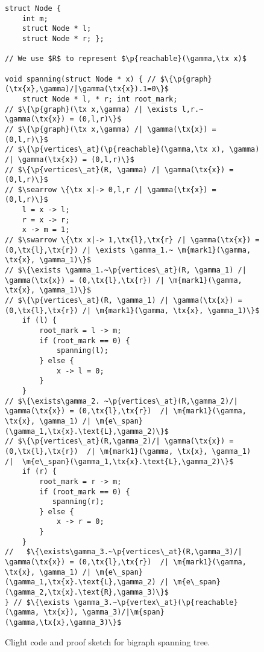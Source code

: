 \begin{figure}
  \begin{lstlisting}
struct Node {
    int m;
    struct Node * l;
    struct Node * r; };

// We use $R$ to represent $\p{reachable}(\gamma,\tx x)$

void spanning(struct Node * x) { // $\{\p{graph}(\tx{x},\gamma)/|\gamma(\tx{x}).1=0\}$
    struct Node * l, * r; int root_mark;
// $\{\p{graph}(\tx x,\gamma) /| \exists l,r.~ \gamma(\tx{x}) = (0,l,r)\}$
// $\{\p{graph}(\tx x,\gamma) /| \gamma(\tx{x}) = (0,l,r)\}$
// $\{\p{vertices\_at}(\p{reachable}(\gamma,\tx x), \gamma) /| \gamma(\tx{x}) = (0,l,r)\}$
// $\{\p{vertices\_at}(R, \gamma) /| \gamma(\tx{x}) = (0,l,r)\}$
// $\searrow \{\tx x|-> 0,l,r /| \gamma(\tx{x}) = (0,l,r)\}$
    l = x -> l;
    r = x -> r;
    x -> m = 1;
// $\swarrow \{\tx x|-> 1,\tx{l},\tx{r} /| \gamma(\tx{x}) = (0,\tx{l},\tx{r}) /| \exists \gamma_1.~ \m{mark1}(\gamma, \tx{x}, \gamma_1)\}$
// $\{\exists \gamma_1.~\p{vertices\_at}(R, \gamma_1) /| \gamma(\tx{x}) = (0,\tx{l},\tx{r}) /| \m{mark1}(\gamma, \tx{x}, \gamma_1)\}$
// $\{\p{vertices\_at}(R, \gamma_1) /| \gamma(\tx{x}) = (0,\tx{l},\tx{r}) /| \m{mark1}(\gamma, \tx{x}, \gamma_1)\}$
    if (l) {
        root_mark = l -> m;
        if (root_mark == 0) {
            spanning(l);
        } else {
            x -> l = 0;
        }
    }
// $\{\exists\gamma_2. ~\p{vertices\_at}(R,\gamma_2)/| \gamma(\tx{x}) = (0,\tx{l},\tx{r})  /| \m{mark1}(\gamma, \tx{x}, \gamma_1) /| \m{e\_span}(\gamma_1,\tx{x}.\text{L},\gamma_2)\}$
// $\{\p{vertices\_at}(R,\gamma_2)/| \gamma(\tx{x}) = (0,\tx{l},\tx{r})  /| \m{mark1}(\gamma, \tx{x}, \gamma_1) /|  \m{e\_span}(\gamma_1,\tx{x}.\text{L},\gamma_2)\}$
    if (r) {
        root_mark = r -> m;
        if (root_mark == 0) {
           spanning(r);
        } else {
            x -> r = 0;
        }
    }
//   $\{\exists\gamma_3.~\p{vertices\_at}(R,\gamma_3)/| \gamma(\tx{x}) = (0,\tx{l},\tx{r})  /| \m{mark1}(\gamma, \tx{x}, \gamma_1) /| \m{e\_span}(\gamma_1,\tx{x}.\text{L},\gamma_2) /| \m{e\_span}(\gamma_2,\tx{x}.\text{R},\gamma_3)\}$
} // $\{\exists \gamma_3.~\p{vertex\_at}(\p{reachable}(\gamma, \tx{x}), \gamma_3)/|\m{span}(\gamma,\tx{x},\gamma_3)\}$
\end{lstlisting}

\caption{Clight code and proof sketch for bigraph spanning tree.}
\label{fig:spanning}

\end{figure}